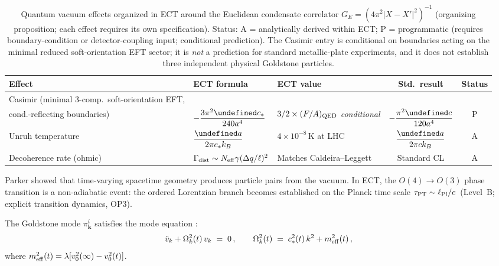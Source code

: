 \documentclass[11pt,a4paper]{article}
\let\hbar\undefined
\numberwithin{equation}{section}
\begin{document}
\begin{table}[H]
\centering
\caption{Quantum vacuum effects organized in ECT around the Euclidean condensate
correlator $G_E=(4\pi^2|X-X'|^2)^{-1}$ (organizing proposition;
each effect requires its own specification).
Status: A = analytically derived within ECT; P = programmatic (requires
boundary-condition or detector-coupling input; conditional prediction).
The Casimir entry is conditional on boundaries acting on the minimal
reduced soft-orientation EFT sector; it is \emph{not} a prediction
for standard metallic-plate experiments, and it does not establish
three independent physical Goldstone particles.}
\label{tab:vacuum_predictions}
\begin{tabular}{@{}lllcc@{}}
\toprule
Effect & ECT formula & ECT value & Std.\ result & Status \\
\midrule
Casimir (minimal 3-comp.\ soft-orientation EFT,\\cond.-reflecting boundaries) &
$-\dfrac{3\pi^2\hbar c_*}{240 a^4}$ &
$3/2\times(F/A)_{\rm QED}$ \emph{conditional} &
$-\dfrac{\pi^2\hbar c}{120 a^4}$ & P \\
Unruh temperature &
$\dfrac{\hbar a}{2\pi c_* k_B}$ &
$4\times10^{-8}$\,K at LHC &
$\dfrac{\hbar a}{2\pi c k_B}$ & A \\[8pt]
Decoherence rate (ohmic) &
$\Gamma_{\rm dist}\sim N_{\rm eff}\gamma(\Delta q/\ell)^2$ &
Matches Caldeira--Leggett & Standard CL & A \\
\bottomrule
\end{tabular}
\end{table}




Parker \cite{Parker1969} showed that time-varying spacetime geometry produces
particle pairs from the vacuum.  In ECT, the $O(4)\to O(3)$ phase transition
is a non-adiabatic event: the ordered Lorentzian branch becomes established on the Planck time scale
$\tau_{\rm PT}\sim\ell_{\rm Pl}/c$~(Level~B; explicit transition dynamics, OP3).

The Goldstone mode $\pi^i_{\boldsymbol{k}}$ satisfies the mode equation
\cite{Parker1969,BirrellDavies1982}:
\begin{equation}
  \ddot{v}_k + \Omega_k^2(t)\,v_k \;=\; 0\,,
  \qquad
  \Omega_k^2(t) \;=\; c_*^2(t)\,k^2 + m_{\rm eff}^2(t)\,,
  \label{eq:mode_equation}
\end{equation}
where $m_{\rm eff}^2(t) = \lambda[v_0^2(\infty) - v_0^2(t)]$.
\end{document}
